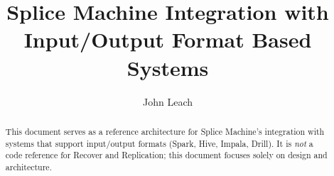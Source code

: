 \documentclass[10pt]{amsart}
\begin{document}
\title{Splice Machine Integration with Input/Output Format Based Systems }
\author{John Leach}

\begin{abstract}
This document serves as a reference architecture for Splice Machine's integration with systems that support 
input/output formats (Spark, Hive, Impala, Drill).    
It is \emph{not} a
code reference for Recover and Replication; this document focuses solely on
design and architecture.
\end{abstract}

\maketitle


\end{document}
